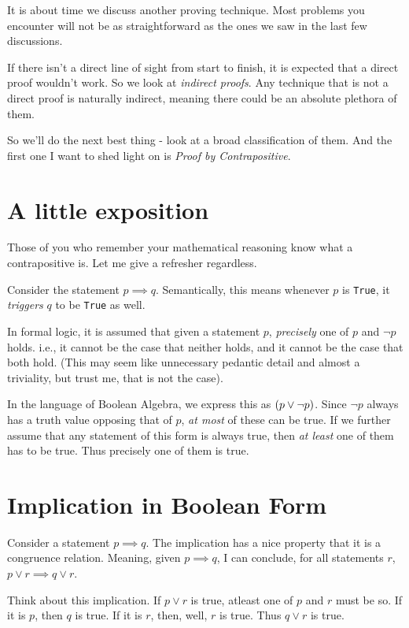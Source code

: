 

It is about time we discuss another proving technique. Most problems you encounter will not be as straightforward as the ones we saw in the last few discussions.

If there isn't a direct line of sight from start to finish, it is expected that a direct proof wouldn't work. So we look at \textit{indirect proofs}. Any technique that is not a direct proof is naturally indirect, meaning there could be an absolute plethora of them.

So we'll do the next best thing - look at a broad classification of them. And the first one I want to shed light on is \textit{Proof by Contrapositive}.

\section*{A little exposition}
Those of you who remember your mathematical reasoning know what a contrapositive is. Let me give a refresher regardless.

Consider the statement $p \implies q$. Semantically, this means whenever $p$ is \texttt{True}, it \textit{triggers} $q$ to be \texttt{True} as well.

In formal logic, it is assumed that given a statement $p$, \textit{precisely} one of $p$ and $\neg p$ holds. i.e., it cannot be the case that neither holds, and it cannot be the case that both hold. (This may seem like unnecessary pedantic detail and almost a triviality, but trust me, that is not the case).

In the language of Boolean Algebra, we express this as $(p \space \vee \neg p)$. Since $\neg p$ always has a truth value opposing that of $p$, \textit{at most} of these can be true. If we further assume that any statement of this form is always true, then \textit{at least} one of them has to be true. Thus precisely one of them is true.

\section*{Implication in Boolean Form}
Consider a statement $p \implies q$. The implication has a nice property that it is a congruence relation. Meaning, given $p \implies q$, I can conclude, for all statements $r$, $p \vee r \implies q \vee r$.

Think about this implication. If $p \vee r$ is true, atleast one of $p$ and $r$ must be so. If it is $p$, then $q$ is true. If it is $r$, then, well, $r$ is true. Thus $q \vee r$ is true.

